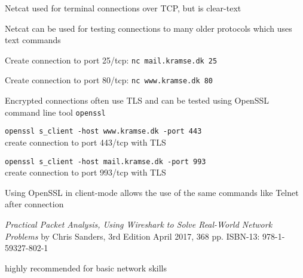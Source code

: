 \documentclass[Screen16to9,17pt]{foils}
\begin{document}
\begin{list1}
\item Netcat used for terminal connections over TCP, but is clear-text
\item Netcat can be used for testing connections to many older protocols which uses text commands
\begin{list2}
\item Create connection to port 25/tcp: \verb+nc mail.kramse.dk 25+
\item Create connection to port 80/tcp: \verb+nc www.kramse.dk 80+
\end{list2}
\item Encrypted connections often use TLS and can be tested using OpenSSL command line tool \verb+openssl+
\begin{list2}
\item \verb+openssl s_client -host www.kramse.dk -port 443+\\
create connection to port 443/tcp with TLS
\item \verb+openssl s_client -host mail.kramse.dk -port 993+\\
create connection to port 993/tcp with TLS
\end{list2}
\item Using OpenSSL in client-mode allows the use of the same commands like Telnet after connection
\end{list1}





\emph{Practical Packet Analysis,
Using Wireshark to Solve Real-World Network Problems}
by Chris Sanders, 3rd Edition
April 2017, 368 pp.
ISBN-13:
978-1-59327-802-1

 highly recommended for basic network skills






\slidenext{}
\end{document}
